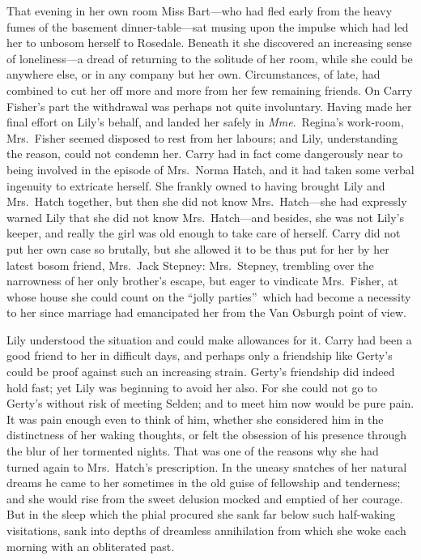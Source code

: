 \documentclass[12pt,a4paper]{book}
\begin{document}
That evening in her own room Miss Bart---who had fled early from
the heavy fumes of the basement dinner-table---sat musing upon the
impulse which had led her to unbosom herself to Rosedale. Beneath
it she discovered an increasing sense of loneliness---a dread of
returning to the solitude of her room, while she could be
anywhere else, or in any company but her own. Circumstances, of
late, had combined to cut her off more and more from her few
remaining friends. On Carry Fisher's part the withdrawal was
perhaps not quite involuntary. Having made her final effort on
Lily's behalf, and landed her safely in \textit{Mme}.\ Regina's work-room,
Mrs.\ Fisher seemed disposed to rest from her labours; and Lily,
understanding the reason, could not condemn her. Carry had in
fact come dangerously near to being involved in the episode of
Mrs.\ Norma Hatch, and it had taken some verbal ingenuity to
extricate herself. She frankly owned to having brought Lily and
Mrs.\ Hatch together, but then she did not know Mrs.\ Hatch---she
had expressly warned Lily that she did not know Mrs.\ Hatch---and
besides, she was not Lily's keeper, and really the girl was old
enough to take care of herself. Carry did not put her own case so
brutally, but she allowed it to be thus put for her by her latest
bosom friend, Mrs.\ Jack Stepney: Mrs.\ Stepney, trembling over the
narrowness of her only brother's escape, but eager to vindicate
Mrs.\ Fisher, at whose house she could count on the ``jolly
parties''\ which had become a necessity to her since marriage had
emancipated her from the Van Osburgh point of view.





Lily understood the situation and could make allowances for it. 
Carry had been a good friend to her in difficult days, and
perhaps only a friendship like Gerty's could be proof against
such an increasing strain. Gerty's friendship did indeed hold
fast; yet Lily was beginning to avoid her also. For she could not
go to Gerty's without risk of meeting Selden; and to meet him now
would be pure pain. It was pain enough even to think of him,
whether she considered him in the distinctness of her waking
thoughts, or felt the obsession of his presence through the blur
of her tormented nights. That was one of the reasons why
she had turned again to Mrs.\ Hatch's prescription. In the uneasy
snatches of her natural dreams he came to her sometimes in the
old guise of fellowship and tenderness; and she would rise from
the sweet delusion mocked and emptied of her courage. But in the
sleep which the phial procured she sank far below such
half-waking visitations, sank into depths of dreamless
annihilation from which she woke each morning with an obliterated
past.
\end{document}
